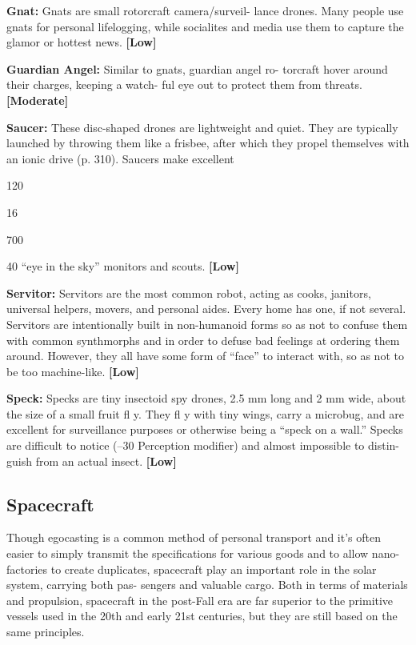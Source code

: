 \textbf{Gnat:} Gnats are small rotorcraft camera/surveil-
lance drones. Many people use gnats for personal 
lifelogging, while socialites and media use them to 
capture the glamor or hottest news. \textbf{[Low]}

\textbf{Guardian Angel:} Similar to gnats, guardian angel ro-
torcraft hover around their charges, keeping a watch-
ful eye out to protect them from threats. \textbf{[Moderate]}

\textbf{Saucer:} These disc-shaped drones are lightweight 
and quiet. They are typically launched by throwing 
them like a frisbee, after which they propel themselves 
with an ionic drive (p. 310). Saucers make excellent 

120

16

700

40
``eye in the sky'' monitors and scouts. \textbf{[Low]}

\textbf{Servitor:  }Servitors are the most common robot, 
acting as cooks, janitors, universal helpers, movers, 
and personal aides. Every home has one, if not several. 
Servitors are intentionally built in non-humanoid 
forms so as not to confuse them with common 
synthmorphs and in order to defuse bad feelings at 
ordering them around. However, they all have some 
form of ``face'' to interact with, so as not to be too 
machine-like. \textbf{[Low]}

\textbf{Speck:} Specks are tiny insectoid spy drones, 2.5 mm 
long and 2 mm wide, about the size of a small fruit fl y. 
They fl y with tiny wings, carry a microbug, and are 
excellent for surveillance purposes or otherwise being 
a ``speck on a wall.'' Specks are difficult to notice (–30 
Perception modifier) and almost impossible to distin-
guish from an actual insect. \textbf{[Low]}

\subsection{Spacecraft}

Though egocasting is a common method of personal 
transport and it's often easier to simply transmit the 
specifications for various goods and to allow nano-
factories to create duplicates, spacecraft play an 
important role in the solar system, carrying both pas-
sengers and valuable cargo. Both in terms of materials 
and propulsion, spacecraft in the post-Fall era are far 
superior to the primitive vessels used in the 20th and 
early 21st centuries, but they are still based on the 
same principles.


